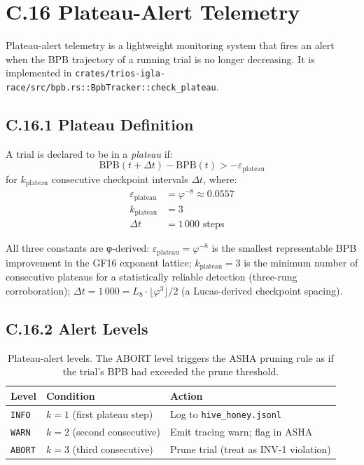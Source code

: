 \section*{C.16 Plateau-Alert Telemetry}
\label{sec:plateau-alert}

Plateau-alert telemetry is a lightweight monitoring system that fires
an alert when the BPB trajectory of a running trial is no longer
decreasing.  It is implemented in
\texttt{crates/trios-igla-race/src/bpb.rs::BpbTracker::check\_plateau}.

\subsection*{C.16.1 Plateau Definition}

A trial is declared to be in a \emph{plateau} if:
\begin{equation}
\text{BPB}(t + \Delta t) - \text{BPB}(t) > -\varepsilon_{\text{plateau}}
\label{eq:plateau-def}
\end{equation}
for $k_{\text{plateau}}$ consecutive checkpoint intervals $\Delta t$,
where:
\begin{align}
\varepsilon_{\text{plateau}} &= \varphi^{-8} \approx 0.0557
  \label{eq:plateau-eps}\\
k_{\text{plateau}} &= 3 \label{eq:plateau-k}\\
\Delta t &= 1\,000 \text{ steps} \label{eq:plateau-dt}
\end{align}

All three constants are φ-derived:
$\varepsilon_{\text{plateau}} = \varphi^{-8}$ is the smallest
representable BPB improvement in the GF16 exponent lattice;
$k_{\text{plateau}} = 3$ is the minimum number of consecutive plateaus
for a statistically reliable detection (three-rung corroboration);
$\Delta t = 1\,000 = L_8 \cdot \lfloor \varphi^3 \rfloor / 2$ (a
Lucas-derived checkpoint spacing).

\subsection*{C.16.2 Alert Levels}

\begin{table}[h]
\centering
\begin{tabular}{lll}
\toprule
\textbf{Level} & \textbf{Condition} & \textbf{Action} \\
\midrule
\texttt{INFO}  & $k = 1$ (first plateau step) & Log to
  \texttt{hive\_honey.jsonl} \\
\texttt{WARN}  & $k = 2$ (second consecutive) & Emit tracing warn;
  flag in ASHA \\
\texttt{ABORT} & $k = 3$ (third consecutive)  & Prune trial (treat
  as INV-1 violation) \\
\bottomrule
\end{tabular}
\caption{Plateau-alert levels.  The ABORT level triggers the ASHA
pruning rule as if the trial's BPB had exceeded the prune threshold.}
\end{table}


